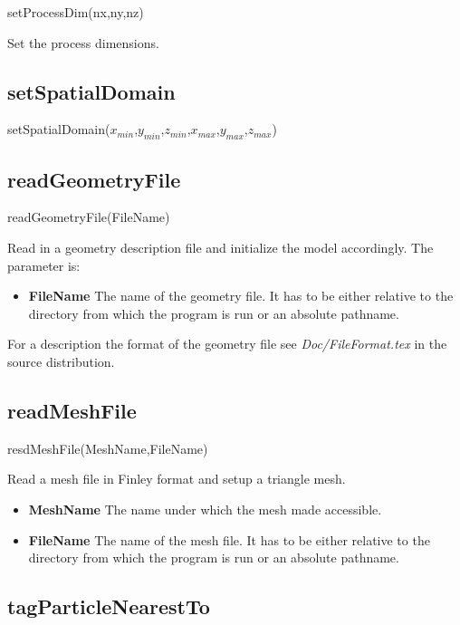 \documentclass{report}
\begin{document}
\textsf{setProcessDim(nx,ny,nz)}
\par \medskip

Set the process dimensions. 

\subsection{setSpatialDomain}

\textsf{setSpatialDomain($x_{min}$,$y_{min}$,$z_{min}$,$x_{max}$,$y_{max}$,$z_{max}$)}
\par \medskip

\subsection{readGeometryFile}

\textsf{readGeometryFile(FileName)}
\par \medskip
Read in a geometry description file and initialize the model accordingly. The parameter is:
\begin{itemize}
\item \textbf{FileName} The name of the geometry file. It has to be either relative to the directory from which the program is run or an absolute pathname.  
\end{itemize}
For a description the format of the geometry file see \textit{Doc/FileFormat.tex} in the source distribution. 

\subsection{readMeshFile}
\label{sec:readMeshFile}
\textsf{resdMeshFile(MeshName,FileName)}
\par \medskip 
Read a mesh file in Finley format and setup a triangle mesh.
\begin{itemize}
\item \textbf{MeshName} The name under which the mesh made accessible.
\item \textbf{FileName} The name of the mesh file. It has to be either relative to the directory from which the program is run or an absolute pathname.  
\end{itemize}
 
\subsection{tagParticleNearestTo}
\end{document}
